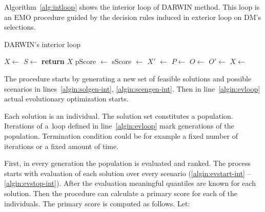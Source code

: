 Algorithm~\ref{alg:intloop} shows the interior loop of DARWIN method. This
loop is an EMO procedure guided by the decision rules induced in exterior loop
on DM's selections.

\begin{algorithm}
\caption{DARWIN's interior loop}\label{alg:intloop}
  \begin{algorithmic}[1]
    \State $X \gets$  \label{algin:solgen-int}
    \State $S \gets$  \label{algin:scengen-int}
    \Loop \label{algin:evloop}
     \label{algin:evstart-int} 
    \State {}
    \EndFor{} \label{algin:evstop-int}
    \State \textbf{return} $X$
    \EndIf
    \State pScore $\gets$  \label{algin:ps}
    \State sScore $\gets$  \label{algin:ss}
    \State $X'$ $\gets$  \label{algin:rank}
    \State $P \gets$  \label{algin:select}
    \State $O \gets$  \label{algin:off}
    \State $O' \gets$  \label{algin:mut}
    \State $X \gets$  \label{algin:merge}
    \EndLoop
    \EndProcedure{}
  \end{algorithmic}
\end{algorithm}

The procedure starts by generating a new set of feasible solutions and
possible scenarios in lines~\ref{algin:solgen-int},
\ref{algin:scengen-int}. Then in line~\ref{algin:evloop} actual evolutionary
optimization starts.

Each solution is an individual. The solution set constitutes a
population. Iterations of a~loop defined in line~\ref{algin:evloop} mark
generations of the population. Termination condition could be for example a
fixed number of iterations or a fixed amount of time.

First, in every generation the population is evaluated and ranked. The process
starts with evaluation of each solution over every scenario
(\ref{algin:evstart-int} -- \ref{algin:evstop-int}). After the evaluation
meaningful quantiles are known for each solution. Then the procedure can
calculate a primary score for each of the individuals. The primary score is
computed as follows. Let:

